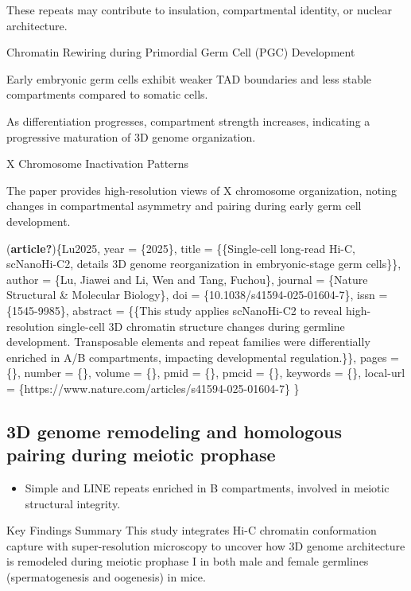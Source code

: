 \documentclass[
  a4paper,
  openany]{scrbook}
\providecommand{\tightlist}{%
  \setlength{\itemsep}{0pt}\setlength{\parskip}{0pt}}
\begin{document}
These repeats may contribute to insulation, compartmental identity, or
nuclear architecture.

Chromatin Rewiring during Primordial Germ Cell (PGC) Development

Early embryonic germ cells exhibit weaker TAD boundaries and less stable
compartments compared to somatic cells.

As differentiation progresses, compartment strength increases,
indicating a progressive maturation of 3D genome organization.

X Chromosome Inactivation Patterns

The paper provides high-resolution views of X chromosome organization,
noting changes in compartmental asymmetry and pairing during early germ
cell development.

(\textbf{article?})\{Lu2025, year = \{2025\}, title = \{\{Single-cell
long-read Hi-C, scNanoHi-C2, details 3D genome reorganization in
embryonic-stage germ cells\}\}, author = \{Lu, Jiawei and Li, Wen and
Tang, Fuchou\}, journal = \{Nature Structural \& Molecular Biology\},
doi = \{10.1038/s41594-025-01604-7\}, issn = \{1545-9985\}, abstract =
\{\{This study applies scNanoHi-C2 to reveal high-resolution single-cell
3D chromatin structure changes during germline development. Transposable
elements and repeat families were differentially enriched in A/B
compartments, impacting developmental regulation.\}\}, pages = \{\},
number = \{\}, volume = \{\}, pmid = \{\}, pmcid = \{\}, keywords =
\{\}, local-url = \{https://www.nature.com/articles/s41594-025-01604-7\}
\}

\subsection{3D genome remodeling and homologous pairing during meiotic
prophase}\label{d-genome-remodeling-and-homologous-pairing-during-meiotic-prophase}

\begin{itemize}
\tightlist
\item
  Simple and LINE repeats enriched in B compartments, involved in
  meiotic structural integrity.
\end{itemize}

Key Findings Summary This study integrates Hi-C chromatin conformation
capture with super-resolution microscopy to uncover how 3D genome
architecture is remodeled during meiotic prophase I in both male and
female germlines (spermatogenesis and oogenesis) in mice.
\end{document}

